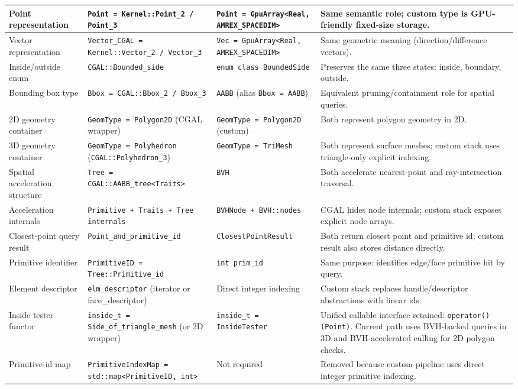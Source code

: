 \documentclass[11pt,a4paper]{article}
\begin{document}
\begin{longtable}{p{} p{} p{} p{}}
Point representation & \texttt{Point = Kernel::Point\_2 / Point\_3} & \texttt{Point = GpuArray<Real, AMREX\_SPACEDIM>} & Same semantic role; custom type is GPU-friendly fixed-size storage. \\
\midrule
Vector representation & \texttt{Vector\_CGAL = Kernel::Vector\_2 / Vector\_3} & \texttt{Vec = GpuArray<Real, AMREX\_SPACEDIM>} & Same geometric meaning (direction/difference vectors). \\
\midrule
Inside/outside enum & \texttt{CGAL::Bounded\_side} & \texttt{enum class BoundedSide} & Preserves the same three states: inside, boundary, outside. \\
\midrule
Bounding box type & \texttt{Bbox = CGAL::Bbox\_2 / Bbox\_3} & \texttt{AABB} (alias \texttt{Bbox = AABB}) & Equivalent pruning/containment role for spatial queries. \\
\midrule
2D geometry container & \texttt{GeomType = Polygon2D} (CGAL wrapper) & \texttt{GeomType = Polygon2D} (custom) & Both represent polygon geometry in 2D. \\
\midrule
3D geometry container & \texttt{GeomType = Polyhedron} (\texttt{CGAL::Polyhedron\_3}) & \texttt{GeomType = TriMesh} & Both represent surface meshes; custom stack uses triangle-only explicit indexing. \\
\midrule
Spatial acceleration structure & \texttt{Tree = CGAL::AABB\_tree<Traits>} & \texttt{BVH} & Both accelerate nearest-point and ray-intersection traversal. \\
\midrule
Acceleration internals & \texttt{Primitive + Traits + Tree internals} & \texttt{BVHNode + BVH::nodes} & CGAL hides node internals; custom stack exposes explicit node arrays. \\
\midrule
Closest-point query result & \texttt{Point\_and\_primitive\_id} & \texttt{ClosestPointResult} & Both return closest point and primitive id; custom result also stores distance directly. \\
\midrule
Primitive identifier & \texttt{PrimitiveID = Tree::Primitive\_id} & \texttt{int prim\_id} & Same purpose: identifies edge/face primitive hit by query. \\
\midrule
Element descriptor & \texttt{elm\_descriptor} (iterator or face\_descriptor) & Direct integer indexing & Custom stack replaces handle/descriptor abstractions with linear ids. \\
\midrule
Inside tester functor & \texttt{inside\_t = Side\_of\_triangle\_mesh} (or 2D wrapper) & \texttt{inside\_t = InsideTester} & Unified callable interface retained: \texttt{operator()(Point)}. Current path uses BVH-backed queries in 3D and BVH-accelerated culling for 2D polygon checks. \\
\midrule
Primitive-id map & \texttt{PrimitiveIndexMap = std::map<PrimitiveID, int>} & Not required & Removed because custom pipeline uses direct integer primitive indexing. \\

\bottomrule
\end{longtable}
\end{document}
